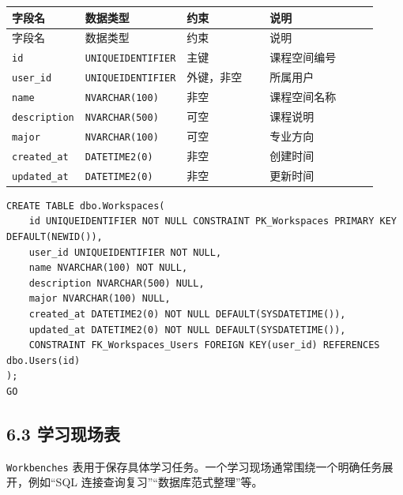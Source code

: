 \documentclass[10pt,a4paper,fontset=none]{ctexart}
\begin{document}
\begingroup\scriptsize
\renewcommand{\arraystretch}{1.18}
\setlength{\LTleft}{0pt}
\setlength{\LTright}{0pt}
\begin{longtable}{>{\raggedright\arraybackslash}p{0.20\linewidth}>{\raggedright\arraybackslash}p{0.16\linewidth}>{\raggedright\arraybackslash}p{0.24\linewidth}>{\raggedright\arraybackslash}p{0.32\linewidth}}
\toprule
字段名 & 数据类型 & 约束 & 说明 \\
\midrule
\endfirsthead
\toprule
字段名 & 数据类型 & 约束 & 说明 \\
\midrule
\endhead
\texttt{id} & \texttt{UNIQUEIDENTIFIER} & 主键 & 课程空间编号 \\
\texttt{user\_id} & \texttt{UNIQUEIDENTIFIER} & 外键，非空 & 所属用户 \\
\texttt{name} & \texttt{NVARCHAR(100)} & 非空 & 课程空间名称 \\
\texttt{description} & \texttt{NVARCHAR(500)} & 可空 & 课程说明 \\
\texttt{major} & \texttt{NVARCHAR(100)} & 可空 & 专业方向 \\
\texttt{created\_at} & \texttt{DATETIME2(0)} & 非空 & 创建时间 \\
\texttt{updated\_at} & \texttt{DATETIME2(0)} & 非空 & 更新时间 \\
\bottomrule
\end{longtable}
\endgroup


\begin{Verbatim}[fontsize=\scriptsize,frame=single]
CREATE TABLE dbo.Workspaces(
    id UNIQUEIDENTIFIER NOT NULL CONSTRAINT PK_Workspaces PRIMARY KEY DEFAULT(NEWID()),
    user_id UNIQUEIDENTIFIER NOT NULL,
    name NVARCHAR(100) NOT NULL,
    description NVARCHAR(500) NULL,
    major NVARCHAR(100) NULL,
    created_at DATETIME2(0) NOT NULL DEFAULT(SYSDATETIME()),
    updated_at DATETIME2(0) NOT NULL DEFAULT(SYSDATETIME()),
    CONSTRAINT FK_Workspaces_Users FOREIGN KEY(user_id) REFERENCES dbo.Users(id)
);
GO
\end{Verbatim}

\subsection*{6.3 学习现场表}

\texttt{Workbenches} 表用于保存具体学习任务。一个学习现场通常围绕一个明确任务展开，例如“SQL 连接查询复习”“数据库范式整理”等。\par
\end{document}
